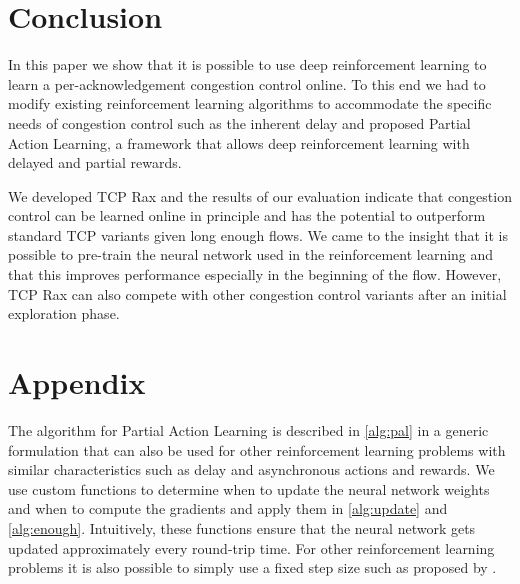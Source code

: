 \documentclass[newfonts=false,format=sigconf,10pt,letterpaper]{acmart}
\begin{document}
\section{Conclusion}

In this paper we show that it is possible to use deep reinforcement learning to learn a per-acknowledgement congestion control online. To this end we had to modify existing reinforcement learning algorithms to accommodate the specific needs of congestion control such as the inherent delay and proposed Partial Action Learning, a framework that allows deep reinforcement learning with delayed and partial rewards. 

We developed TCP Rax and the results of our evaluation indicate that congestion control can be learned online in principle and has the potential to outperform standard TCP variants given long enough flows. We came to the insight that it is possible to pre-train the neural network used in the reinforcement learning and that this improves performance especially in the beginning of the flow. However, TCP Rax can also compete with other congestion control variants after an initial exploration phase.

\section*{Appendix}	

The algorithm for Partial Action Learning is described in \autoref{alg:pal} in a generic formulation that can also be used for other reinforcement learning problems with similar characteristics such as delay and asynchronous actions and rewards. We use custom functions to determine when to update the neural network weights and when to compute the gradients and apply them in \autoref{alg:update} and \autoref{alg:enough}. Intuitively, these functions ensure that the neural network gets updated approximately every round-trip time. For other reinforcement learning problems it is also possible to simply use a fixed step size such as proposed by \cite{mnih_asynchronous_2016}.
\end{document}
